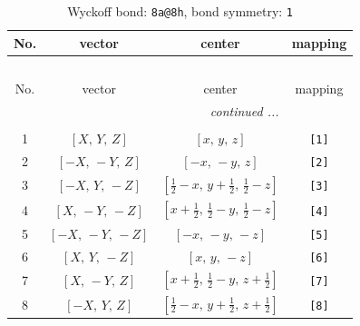 \documentclass[fleqn,8pt]{jsarticle}
\begin{document}
\begin{longtable}{cccc}
\caption{Wyckoff bond: {\tt 8a@8h}, bond symmetry: {\tt 1}}
 \\
 \hline \hline
No. & vector & center & mapping \\ \hline \endfirsthead

\multicolumn{3}{l}{\tablename\ \thetable{}} \\
 \hline \hline
No. & vector & center & mapping \\ \hline \endhead

 \hline \hline
\multicolumn{3}{r}{\footnotesize\it continued ...} \\ \endfoot

 \hline \hline
\multicolumn{3}{r}{} \\ \endlastfoot

1 & $\left[ X,\, Y,\, Z \right]$ & $\left[ x,\, y,\, z \right]$ & {\tt [1]} \\ \hline
2 & $\left[ - X,\, - Y,\, Z \right]$ & $\left[ - x,\, - y,\, z \right]$ & {\tt [2]} \\ \hline
3 & $\left[ - X,\, Y,\, - Z \right]$ & $\left[ \frac{1}{2} - x,\, y + \frac{1}{2},\, \frac{1}{2} - z \right]$ & {\tt [3]} \\ \hline
4 & $\left[ X,\, - Y,\, - Z \right]$ & $\left[ x + \frac{1}{2},\, \frac{1}{2} - y,\, \frac{1}{2} - z \right]$ & {\tt [4]} \\ \hline
5 & $\left[ - X,\, - Y,\, - Z \right]$ & $\left[ - x,\, - y,\, - z \right]$ & {\tt [5]} \\ \hline
6 & $\left[ X,\, Y,\, - Z \right]$ & $\left[ x,\, y,\, - z \right]$ & {\tt [6]} \\ \hline
7 & $\left[ X,\, - Y,\, Z \right]$ & $\left[ x + \frac{1}{2},\, \frac{1}{2} - y,\, z + \frac{1}{2} \right]$ & {\tt [7]} \\ \hline
8 & $\left[ - X,\, Y,\, Z \right]$ & $\left[ \frac{1}{2} - x,\, y + \frac{1}{2},\, z + \frac{1}{2} \right]$ & {\tt [8]} \\
\end{longtable}
\end{document}
